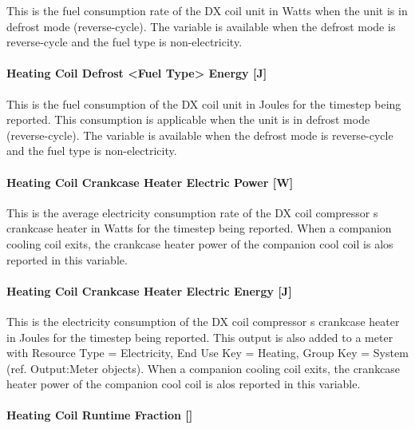 This is the fuel consumption rate of the DX coil unit in Watts when the unit is in defrost mode (reverse-cycle). The variable is available when the defrost mode is reverse-cycle and the fuel type is non-electricity.

\paragraph{Heating Coil Defrost \textless{}Fuel Type\textgreater{} Energy {[}J{]}}\label{heating-coil-defrost-fuel-type-energy-j}

This is the fuel consumption of the DX coil unit in Joules for the timestep being reported. This consumption is applicable when the unit is in defrost mode (reverse-cycle). The variable is available when the defrost mode is reverse-cycle and the fuel type is non-electricity.

\paragraph{Heating Coil Crankcase Heater Electric Power {[}W{]}}\label{heating-coil-crankcase-heater-electric-power-w-1}

This is the average electricity consumption rate of the DX coil compressor s crankcase heater in Watts for the timestep being reported. When a companion cooling coil exits, the crankcase heater power of the companion cool coil is alos reported in this variable.

\paragraph{Heating Coil Crankcase Heater Electric Energy {[}J{]}}\label{heating-coil-crankcase-heater-electric-energy-j-1}

This is the electricity consumption of the DX coil compressor s crankcase heater in Joules for the timestep being reported. This output is also added to a meter with Resource Type = Electricity, End Use Key = Heating, Group Key = System (ref. Output:Meter objects). When a companion cooling coil exits, the crankcase heater power of the companion cool coil is alos reported in this variable.

\paragraph{\texorpdfstring{Heating Coil Runtime Fraction {[]}}{Heating Coil Runtime Fraction }}\label{heating-coil-runtime-fraction-5}

